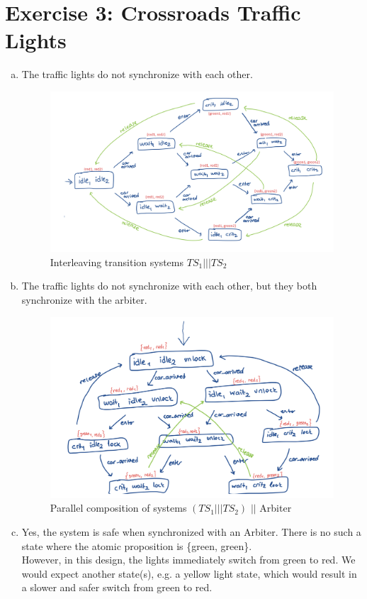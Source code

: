 \documentclass{article}
\begin{document}
\newpage

\section*{Exercise 3: Crossroads Traffic Lights}

\begin{enumerate}[(a)]
    \item{The traffic lights do not synchronize with each other.}
    \begin{figure}[!htb]
        \centering
        \includegraphics[width=5in]{images/3a.png}
        \caption{Interleaving transition systems $TS_1 | | | TS_2$}
        \label{fig:2a}
    \end{figure}

    \item{The traffic lights do not synchronize with each other, but they both synchronize
with the arbiter.}
    \begin{figure}[!htb]
        \centering
        \includegraphics[width=5in]{images/3b.png}
        \caption{Parallel composition of systems $(TS_1 | | | TS_2)$ $| |$ Arbiter}
        \label{fig:2a}
    \end{figure}

    \item{Yes, the system is safe when synchronized with an Arbiter. There is no such a state where the atomic proposition is \{green, green\}.}\\
    However, in this design, the lights immediately switch from green to red. We would expect another state(s), e.g. a yellow light state, which would result in a slower and safer switch from green to red. 
\end{enumerate}
\end{document}
